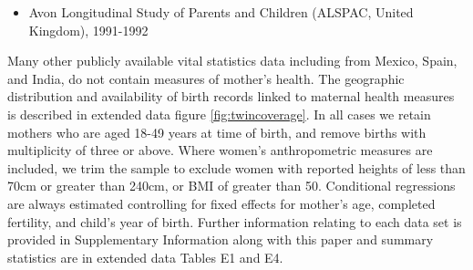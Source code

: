 \documentclass{nature}
\begin{document}
\begin{linenumbers}
\begin{itemize}
\item Avon Longitudinal Study of Parents and Children (ALSPAC, United Kingdom), 1991-1992 \vspace{-4mm}
\end{itemize}
Many other %
publicly available vital statistics data including from Mexico, Spain, and India, do not contain  measures of mother's health.  The geographic distribution and availability of birth records linked to maternal health measures is described in extended data figure \ref{fig:twincoverage}. In all cases we retain mothers who are aged 18-49 years at time of birth, and remove births with multiplicity of three or above.  Where women's anthropometric measures are included, we trim the sample to exclude women with reported heights of less than 70cm or greater than 240cm, or BMI of greater than 50.  Conditional regressions are always estimated controlling for fixed effects for mother's age, completed fertility, and child's year of birth. Further information relating to each data set is provided in Supplementary Information along with this paper and summary statistics are in extended data Tables E1 and E4.   %





\end{linenumbers}
\end{document}
